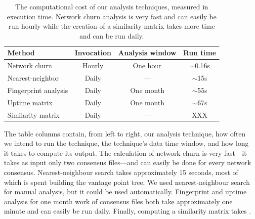 \begin{table}[t]
	\centering
	\begin{tabular}{lccc}
	\textbf{Method} & \textbf{Invocation} & \textbf{Analysis window} & \textbf{Run time} \\
	\hline
	Network churn & Hourly & One hour & $\sim$0.16s \\
	Nearest-neighbor & Daily & --- & $\sim$15s \\
	Fingerprint analysis & Daily & One month & $\sim$55s \\
	Uptime matrix & Daily & One month & $\sim$67s \\
	Similarity matrix & Daily & --- & XXX \\
	\end{tabular}
	\caption{The computational cost of our analysis techniques, measured in
	execution time.  Network churn analysis is very fast and can easily be run
	hourly while the creation of a similarity matrix takes more time and can be
	run daily.}
	\label{tab:exp-deployment}
\end{table}

The table columns contain, from left to right, our analysis technique, how often
we intend to run the technique, the technique's data time window, and how long
it takes to compute its output.  The calculation of network churn is very
fast---it takes as input only two consensus files---and can easily be done for
every network consensus.  Nearest-neighbour search takes approximately 15
seconds, most of which is spent building the vantage point tree.  We used
nearest-neighbour search for manual analysis, but it could be used
automatically.  Fingerprint and uptime analysis for one month work of consensus
files both take approximately one minute and can easily be run daily.  Finally,
computing a similarity matrix takes .

